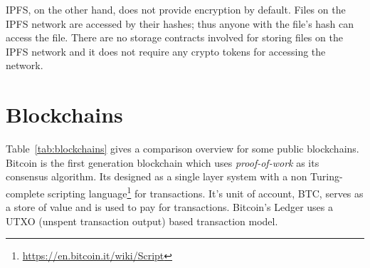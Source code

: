 		IPFS, on the other hand, does not provide encryption by default. Files on the IPFS network are accessed by their hashes; thus anyone with the file's hash can access the file. There are no storage contracts involved for storing files on the IPFS network and it does not require any crypto tokens for accessing the network.
		
	\section{Blockchains}
		Table~\ref{tab:blockchains} gives a comparison overview for some public blockchains. Bitcoin\cite{nakamoto2008bitcoin} is the first generation blockchain which uses \textit{proof-of-work} as its consensus algorithm. Its designed as a single layer system with a non Turing-complete scripting language\footnote{\url{https://en.bitcoin.it/wiki/Script}} for transactions. It's unit of account, BTC, serves as a store of value and is used to pay for transactions. Bitcoin's Ledger uses a UTXO (unspent transaction output) based transaction model.
	
